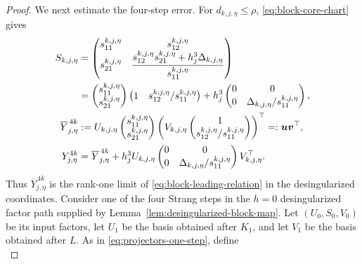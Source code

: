 \documentclass[10pt,a4paper]{amsart}
\numberwithin{equation}{section}
\begin{document}
\begin{proof}
We next estimate the four-step error.  For
\(d_{k,j,\eta}\le\rho\), \eqref{eq:block-core-chart} gives
\begin{align}
 S_{k,j,\eta}
 &=\begin{pmatrix}
 s_{11}^{k,j,\eta}&s_{12}^{k,j,\eta}\\
 s_{21}^{k,j,\eta}&
 \dfrac{s_{12}^{k,j,\eta}s_{21}^{k,j,\eta}
       +h_j^3\Delta_{k,j,\eta}}{s_{11}^{k,j,\eta}}
 \end{pmatrix}\notag\\
 &=\begin{pmatrix}s_{11}^{k,j,\eta}\\s_{21}^{k,j,\eta}\end{pmatrix}
   \begin{pmatrix}1&s_{12}^{k,j,\eta}/s_{11}^{k,j,\eta}\end{pmatrix}
 +h_j^3\begin{pmatrix}
 0&0\\0&\Delta_{k,j,\eta}/s_{11}^{k,j,\eta}
 \end{pmatrix},
 \label{eq:block-core-positive-step-expansion}\\
 \overline Y_{j,\eta}^{\,4k}
 &:=U_{k,j,\eta}
 \begin{pmatrix}s_{11}^{k,j,\eta}\\s_{21}^{k,j,\eta}\end{pmatrix}
 \left(
 V_{k,j,\eta}
 \begin{pmatrix}1\\s_{12}^{k,j,\eta}/s_{11}^{k,j,\eta}\end{pmatrix}
 \right)^\top
 =:\boldsymbol u\boldsymbol v^\top,
 \label{eq:block-leading-matrix}\\
 Y_{j,\eta}^{4k}
 &=\overline Y_{j,\eta}^{\,4k}
 +h_j^3U_{k,j,\eta}
 \begin{pmatrix}
 0&0\\0&\Delta_{k,j,\eta}/s_{11}^{k,j,\eta}
 \end{pmatrix}
 V_{k,j,\eta}^\top.
 \label{eq:block-leading-relation}
\end{align}
Thus \(\overline Y_{j,\eta}^{\,4k}\) is the rank-one limit of
\eqref{eq:block-leading-relation} in the desingularized coordinates.
Consider one of
the four Strang steps in the $h=0$ desingularized factor path supplied by
Lemma~\ref{lem:desingularized-block-map}.  Let
$(U_0,S_0,V_0)$ be its input factors, let $U_1$ be the basis obtained
after $K_1$, and let $V_1$ be the basis obtained after $L$.  As in
\eqref{eq:projectors-one-step}, define
\begin{equation}\label{eq:block-proof-projectors}

\end{equation}
\end{proof}
\end{document}
